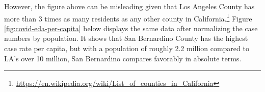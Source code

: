 \documentclass{article}
\begin{document}

However, the figure above can be misleading given that Los Angeles County has more than 3 times as many residents as any other county in California.\footnote{\url{https://en.wikipedia.org/wiki/List_of_counties_in_California}} Figure \ref{fig:covid-eda-per-capita} below displays the same data after normalizing the case numbers by population. It shows that San Bernardino County has the highest case rate per capita, but with a population of roughly 2.2 million compared to LA’s over 10 million, San Bernardino compares favorably in absolute terms.
\end{document}
